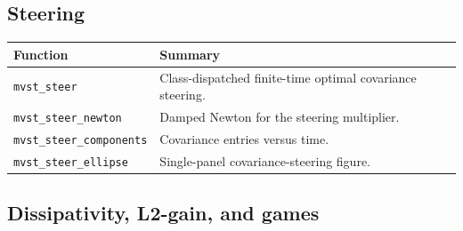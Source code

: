 \documentclass[11pt,oneside]{report}
\newcommand{\code}[1]{\texttt{#1}}
\begin{document}
\hypertarget{steering}{%
\subsection{Steering}\label{steering}}

\begin{longtable}[]{@{}ll@{}}
\toprule
Function & Summary \\
\midrule
\endhead
\code{mvst\_steer} & Class-dispatched finite-time optimal covariance steering. \\
\code{mvst\_steer\_newton} & Damped Newton for the steering multiplier. \\
\code{mvst\_steer\_components} & Covariance entries versus time. \\
\code{mvst\_steer\_ellipse} & Single-panel covariance-steering figure. \\
\bottomrule
\end{longtable}

\hypertarget{dissipativity-l2-gain-and-games}{%
\subsection{Dissipativity, L2-gain, and games}\label{dissipativity-l2-gain-and-games}}
\end{document}
